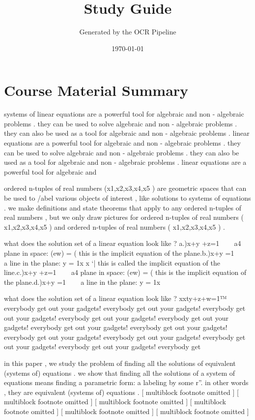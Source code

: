 \documentclass[12pt]{article}
\title{Study Guide}
\author{Generated by the OCR Pipeline}
\date{\today}
\begin{document}
\maketitle
\tableofcontents
\newpage

\section{Course Material Summary}
 systems of linear equations are a powerful tool for algebraic and non - algebraic problems . 
 they can be used to solve algebraic and non - algebraic problems . 
 they can also be used as a tool for algebraic and non - algebraic problems .    
 linear equations are a powerful tool for algebraic and non - algebraic problems . 
 they can be used to solve algebraic and non - algebraic problems . 
 they can also be used as a tool for algebraic and non - algebraic problems .    
 linear equations are a powerful tool for algebraic and

 ordered n-tuples of real numbers (x1,x2,x3,x4,x5 ) are geometric spaces that can be used to /abel various objects of interest , like solutions to systems of equations . 
 we make definitions and state theorems that apply to any ordered n-tuples of real numbers , but we only draw pictures for ordered n-tuples of real numbers ( x1,x2,x3,x4,x5 ) and ordered n-tuples of real numbers ( x1,x2,x3,x4,x5 ) . 

 what does the solution set of a linear equation look like ? a.)x+y +z=1 ~~~ a4 plane in space: (ew) = ( this is the implicit equation of the plane.b.)x+y =1 ~~~ a line in the plane: y = 1x x `| this is called the implicit equation of the line.c.)x+y +z=1 ~~~ a4 plane in space: (ew) = ( this is the implicit equation of the plane.d.)x+y =1 ~~~ a line in the plane: y = 1x

 what does the solution set of a linear equation look like ? xxty+z+w=1™%
 everybody get out your gadgets! 
 everybody get out your gadgets! 
 everybody get out your gadgets! 
 everybody get out your gadgets! 
 everybody get out your gadgets! 
 everybody get out your gadgets! 
 everybody get out your gadgets! 
 everybody get out your gadgets! 
 everybody get out your gadgets! 
 everybody get out your gadgets! 
 everybody get out your gadgets! 
 everybody get

 in this paper , we study the problem of finding all the solutions of equivalent (systems of) equations . 
 we show that finding all the solutions of a system of equations means finding a parametric form: a labeling by some r”. in other words , they are equivalent (systems of) equations .    
 [ multiblock footnote omitted ]    [ multiblock footnote omitted ]    [ multiblock footnote omitted ]    [ multiblock footnote omitted ]    [ multiblock footnote omitted ]    [ multiblock footnote omitted ]  
\end{document}
